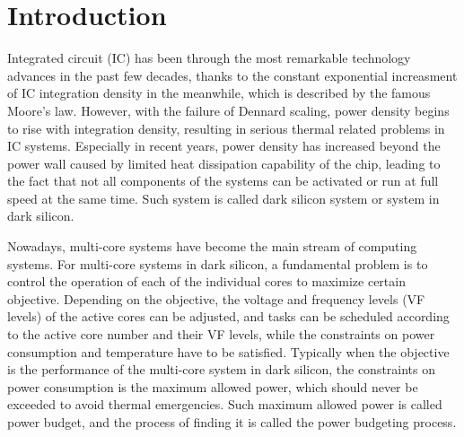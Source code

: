 \section{Introduction}

Integrated circuit (IC) has been through the most remarkable technology advances in the past few decades, thanks to the constant exponential increasment of IC integration density in the meanwhile, which is described by the famous Moore's law. However, with the failure of Dennard scaling, power density begins to rise with integration density, resulting in serious thermal related problems in IC systems. Especially in recent years, power density has increased beyond the power wall caused by limited heat dissipation capability of the chip, leading to the fact that not all components of the systems can be activated or run at full speed at the same time. Such system is called dark silicon system or system in dark silicon.

Nowadays, multi-core systems have become the main stream of computing systems. For multi-core systems in dark silicon, a fundamental problem is to control the operation of each of the individual cores to maximize certain objective. Depending on the objective, the voltage and frequency levels (VF levels) of the active cores can be adjusted, and tasks can be scheduled according to the active core number and their VF levels, while the constraints on power consumption and temperature have to be satisfied. Typically when the objective is the performance of the multi-core system in dark silicon, the constraints on power consumption is the maximum allowed power, which should never be exceeded to avoid thermal emergencies. Such maximum allowed power is called power budget, and the process of finding it is called the power budgeting process. 

